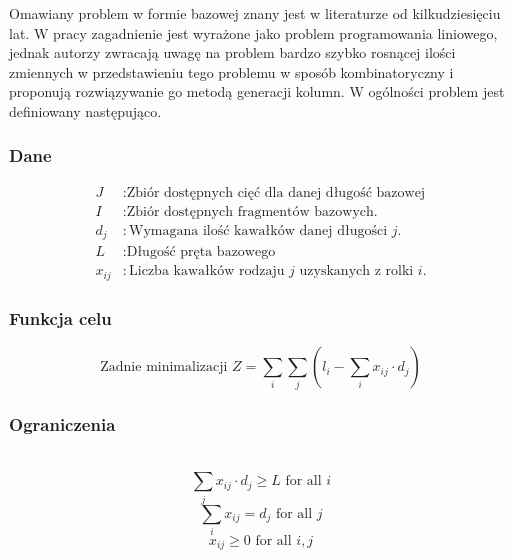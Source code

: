 Omawiany problem w formie bazowej znany jest w literaturze od kilkudziesięciu lat. W pracy \cite{linear-programming} zagadnienie jest wyrażone jako problem programowania liniowego,
jednak autorzy zwracają uwagę na problem bardzo szybko rosnącej ilości zmiennych w przedstawieniu tego problemu w sposób kombinatoryczny i proponują rozwiązywanie go metodą generacji kolumn. W ogólności problem jest definiowany następująco. 

\subsubsection*{Dane}

\begin{align*}
J & : \text{Zbiór dostępnych cięć dla danej długość bazowej} \\
I & : \text{Zbiór dostępnych fragmentów bazowych.} \\
d_j & : \text{Wymagana ilość kawałków danej długości } j. \\
L & : \text{Długość pręta bazowego } \\
x_{ij} & : \text{Liczba kawałków rodzaju } j \text{ uzyskanych z rolki } i.
\end{align*}


\subsubsection*{Funkcja celu}

\begin{equation}
\text{Zadnie minimalizacji } Z = \sum_{i}\sum_{j} \left(l_i - \sum_{i} x_{ij} \cdot d_j \right)
\end{equation}

\subsubsection*{Ograniczenia}
\hfill\\
\begin{equation}
\sum_{j} x_{ij} \cdot d_j \geq L \text{ for all } i
\end{equation}
\begin{equation}
\sum_{i} x_{ij} = d_j \text{ for all } j
\end{equation}
\begin{equation}
x_{ij} \geq 0 \text{ for all } i, j
\end{equation}

